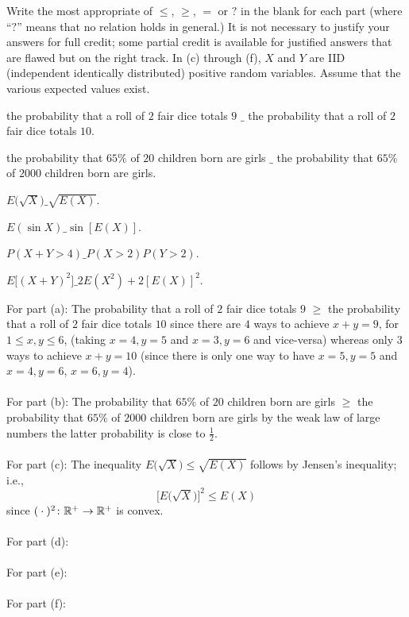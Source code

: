 \begin{problem}
  Write the most appropriate of \(\leq\), \(\geq\), \(=\) or \(?\) in the
  blank for each part (where ``\(?\)'' means that no relation holds in
  general.)  It is not necessary to justify your answers for full credit;
  some partial credit is available for justified answers that are flawed
  but on the right track.  In (c) through (f), \(X\) and \(Y\) are IID
  (independent identically distributed) positive random variables. Assume
  that the various expected values exist.
  \begin{alphlist}
  \item the probability that a roll of \(2\) fair dice totals \(9\) \(\_\) the
    probability that a roll of \(2\) fair dice totals \(10\).
  \item the probability that \(65\%\) of \(20\) children born are girls
    \(\_\) the probability that \(65\%\) of \(2000\) children born are
    girls.
  \item \(E\bigl(\sqrt{X}\bigr)\mathrel{}\_\mathrel{}\sqrt{E(X)}\).
  \item \(E(\sin X)\mathrel{}\_\mathrel{}\sin[E(X)]\).
  \item \(P(X+Y>4)\mathrel{}\_\mathrel{}P(X>2)P(Y>2)\).
  \item \(E\bigl[ (X+Y)^2 \bigr]\mathrel{}\_\mathrel{}2E(X^2)+2[E(X)]^2\).
  \end{alphlist}
\end{problem}
\begin{solution*}
  For part (a): The probability that a roll of \(2\) fair dice totals \(9\)
  \(\geq\) the probability that a roll of \(2\) fair dice totals \(10\)
  since there are \(4\) ways to achieve \(x+y=9\), for \(1\leq x,y\leq 6\),
  (taking \(x=4,y=5\) and \(x=3,y=6\) and vice-versa) whereas only \(3\)
  ways to achieve \(x+y=10\) (since there is only one way to have
  \(x=5,y=5\) and \(x=4,y=6\), \(x=6,y=4\)).
  \\\\
  For part (b): The probability that \(65\%\) of \(20\) children born are
  girls \(\geq\) the probability that \(65\%\) of \(2000\) children born
  are girls by the weak law of large numbers the latter probability is
  close to \(\frac{1}{2}\).
  \\\\
  For part (c): The inequality \(E\bigl(\sqrt{X}\bigr)\leq\sqrt{E(X)}\)
  follows by Jensen's inequality; i.e.,
  \[
    \bigl[E\bigl(\sqrt{X}\bigr)\bigr]^2\leq E(X)
  \]
  since \(({}\cdot{})^2\colon\mathbb{R}^+\to\mathbb{R}^+\) is convex.
  \\\\
  For part (d):
  \\\\
  For part (e):
  \\\\
  For part (f):
\end{solution*}

